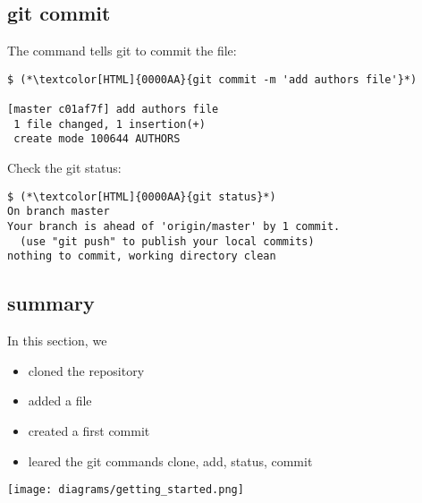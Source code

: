 \subsection{git commit}
\begin{frame}[fragile]
  \subslidetitle

  The command  tells git to commit the file:
  \begin{lstlisting}
$ (*\textcolor[HTML]{0000AA}{git commit -m 'add authors file'}*)

[master c01af7f] add authors file
 1 file changed, 1 insertion(+)
 create mode 100644 AUTHORS
\end{lstlisting}

  Check the git status:
  \begin{lstlisting}
$ (*\textcolor[HTML]{0000AA}{git status}*)
On branch master
Your branch is ahead of 'origin/master' by 1 commit.
  (use "git push" to publish your local commits)
nothing to commit, working directory clean
  \end{lstlisting}

\end{frame}

\subsection{summary}
\begin{frame}[fragile]
  \subslidetitle

  In this section, we

  \begin{itemize}
    \item cloned the repository
    \item added a file
    \item created a first commit
    \item leared the git commands clone, add, status, commit
  \end{itemize}

  \vspace{1cm}
  \texttt{[image: diagrams/getting\_started.png]}

\end{frame}
